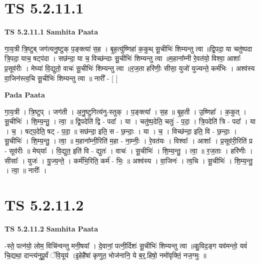 \documentclass[17pt]{extarticle}
\begin{document}
\section{ TS 5.2.11.1 }

\textbf{TS 5.2.11.1 } \newline
\textbf{Samhita Paata} \newline

गा॒य॒त्री त्रि॒ष्टुब् जग॑त्यनु॒ष्टुक् प॒ङ्क्त्या॑ स॒ह । बृ॒ह॒त्यु॑ष्णिहा॑ क॒कुथ् सू॒चीभिः॑ शिम्यन्तु त्वा ॥द्वि॒पदा॒ या चतु॑ष्पदा त्रि॒पदा॒ याच॒ षट्प॑दा । सछ॑न्दा॒ या च॒ विच्छ॑न्दाः सू॒चीभिः॑ शिम्यन्तु त्वा ॥म॒हाना᳚म्नी रे॒वत॑यो॒ विश्वा॒ आशाः᳚ प्र॒सूव॑रीः । मेघ्या॑ वि॒द्युतो॒ वाचः॑ सू॒चीभिः॑ शिम्यन्तु त्वा ॥र॒ज॒ता हरि॑णीः॒ सीसा॒ युजो॑ युज्यन्ते॒ कर्म॑भिः । अश्व॑स्य वा॒जिन॑स्त्व॒चि सू॒चीभिः॑ शिम्यन्तु त्वा ॥ नारी᳚ - [  ] \newline

\textbf{Pada Paata} \newline

गा॒य॒त्री । त्रि॒ष्टुप् । जग॑ती । अ॒नु॒ष्टुगित्य॑नु-स्तुक् । प॒ङ्क्त्या᳚ । स॒ह ॥ बृ॒ह॒ती । उ॒ष्णिहा᳚ । क॒कुत् । सू॒चीभिः॑ । शि॒म्य॒न्तु॒ । त्वा॒ ॥ द्वि॒पदेति॑ द्वि - पदा᳚ । या । चतु॑ष्प॒देति॒ चतुः॑ - प॒दा॒ । त्रि॒पदेति॑ त्रि - पदा᳚ । या । च॒ । षट्प॒देति॒ षट् - प॒दा॒ ॥ सछ॑न्दा॒ इति॒ स - छ॒न्दाः॒ । या । च॒ । विच्छ॑न्दा॒ इति॒ वि - छ॒न्दाः॒ । सू॒चीभिः॑ । शि॒म्य॒न्तु॒ । त्वा॒ ॥ म॒हाना᳚म्नी॒रिति॑ म॒हा - ना॒म्नीः॒ । रे॒वत॑यः । विश्वाः᳚ । आशाः᳚ । प्र॒सूव॑री॒रिति॑ प्र - सूव॑रीः ॥ मेघ्‌याः᳚ । वि॒द्युत॒ इति॑ वि - द्युतः॑ । वाचः॑ । सू॒चीभिः॑ । शि॒म्य॒न्तु॒ । त्वा॒ ॥ र॒ज॒ताः । हरि॑णीः । सीसाः᳚ । युजः॑ । यु॒ज्य॒न्ते॒ । कर्म॑भि॒रिति॒ कर्म॑ -  भिः॒ ॥ अश्व॑स्य । वा॒जिनः॑ । त्व॒चि । सू॒चीभिः॑ । शि॒म्य॒न्तु॒ । त्वा॒ ॥ नारीः᳚ ।  \newline





\section{ TS 5.2.11.2 }

\textbf{TS 5.2.11.2 } \newline
\textbf{Samhita Paata} \newline

-स्ते॒ पत्न॑यो॒ लोम॒ विचि॑न्वन्तु मनी॒षया᳚ । दे॒वानां॒ पत्नी॒र्दिशः॑ सू॒चीभिः॑ शिम्यन्तु त्वा ॥कु॒विद॒ङ्ग यव॑मन्तो॒ यवं॑ चि॒द्यथा॒ दान्त्य॑नुपू॒र्वं ॅवि॒यूय॑ ।इ॒हेहै॑षां कृणुत॒ भोज॑नानि॒ ये ब॒र्॒.हिषो॒ नमो॑वृक्तिं॒ नज॒ग्मुः ॥ \newline
\end{document}
